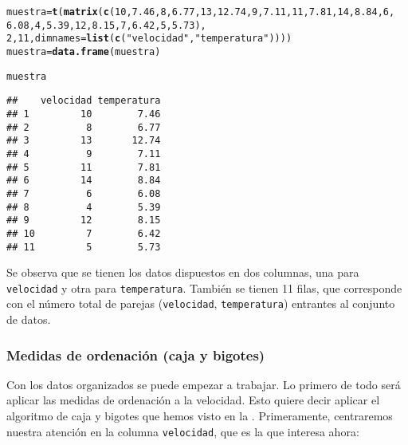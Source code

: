 \documentclass[12pt]{report}\usepackage[]{graphicx}\usepackage[dvipsnames]{xcolor}
\makeatletter
\newcommand{\hlnum}[1]{\textcolor[rgb]{0.686,0.059,0.569}{#1}}%
\newcommand{\hlstr}[1]{\textcolor[rgb]{0.192,0.494,0.8}{#1}}%
\newcommand{\hlstd}[1]{\textcolor[rgb]{0.345,0.345,0.345}{#1}}%
\newcommand{\hlkwb}[1]{\textcolor[rgb]{0.69,0.353,0.396}{#1}}%
\newcommand{\hlkwc}[1]{\textcolor[rgb]{0.333,0.667,0.333}{#1}}%
\newcommand{\hlkwd}[1]{\textcolor[rgb]{0.737,0.353,0.396}{\textbf{#1}}}%
\newenvironment{kframe}{%
 \def\at@end@of@kframe{}%
 \ifinner\ifhmode%
  \def\at@end@of@kframe{\end{minipage}}%
  \begin{minipage}{\columnwidth}%
 \fi\fi%
 \def\FrameCommand##1{\hskip\@totalleftmargin \hskip-\fboxsep
 \colorbox{shadecolor}{##1}\hskip-\fboxsep
     \hskip-\linewidth \hskip-\@totalleftmargin \hskip\columnwidth}%
 \MakeFramed {\advance\hsize-\width
   \@totalleftmargin\z@ \linewidth\hsize
   \@setminipage}}%
 {\par\unskip\endMakeFramed%
 \at@end@of@kframe}
\newenvironment{knitrout}{}{} %
\makeatother
\begin{document}
\begin{knitrout}
\color{fgcolor}\begin{kframe}
\begin{alltt}
\hlstd{muestra} \hlkwb{=} \hlkwd{t}\hlstd{(}\hlkwd{matrix}\hlstd{(}\hlkwd{c}\hlstd{(}\hlnum{10}\hlstd{,}\hlnum{7.46}\hlstd{,}\hlnum{8}\hlstd{,}\hlnum{6.77}\hlstd{,}\hlnum{13}\hlstd{,}\hlnum{12.74}\hlstd{,}\hlnum{9}\hlstd{,}\hlnum{7.11}\hlstd{,}\hlnum{11}\hlstd{,}\hlnum{7.81}\hlstd{,}\hlnum{14}\hlstd{,}\hlnum{8.84}\hlstd{,}\hlnum{6}\hlstd{,}
\hlnum{6.08}\hlstd{,}\hlnum{4}\hlstd{,}\hlnum{5.39}\hlstd{,}\hlnum{12}\hlstd{,}\hlnum{8.15}\hlstd{,}\hlnum{7}\hlstd{,}\hlnum{6.42}\hlstd{,}\hlnum{5}\hlstd{,}\hlnum{5.73}\hlstd{),}
\hlnum{2}\hlstd{,}\hlnum{11}\hlstd{,}\hlkwc{dimnames}\hlstd{=}\hlkwd{list}\hlstd{(}\hlkwd{c}\hlstd{(}\hlstr{"velocidad"}\hlstd{,}\hlstr{"temperatura"}\hlstd{))))}
\hlstd{muestra}\hlkwb{=}\hlkwd{data.frame}\hlstd{(muestra)}

\hlstd{muestra}
\end{alltt}
\begin{verbatim}
##    velocidad temperatura
## 1         10        7.46
## 2          8        6.77
## 3         13       12.74
## 4          9        7.11
## 5         11        7.81
## 6         14        8.84
## 7          6        6.08
## 8          4        5.39
## 9         12        8.15
## 10         7        6.42
## 11         5        5.73
\end{verbatim}
\end{kframe}
\end{knitrout}
				
				Se observa que se tienen los datos dispuestos en dos columnas, una para \texttt{velocidad} y otra para \texttt{temperatura}. También se tienen 11 filas, que corresponde con el número total de parejas (\texttt{velocidad}, \texttt{temperatura}) entrantes al conjunto de datos. 
				
				\subsubsection{Medidas de ordenación (caja y bigotes)}
				
					Con los datos organizados se puede empezar a trabajar. Lo primero de todo será aplicar las medidas de ordenación a la velocidad. Esto quiere decir aplicar el algoritmo de caja y bigotes que hemos visto en la . Primeramente, centraremos nuestra atención en la columna \texttt{velocidad}, que es la que interesa ahora:
					
\end{document}
